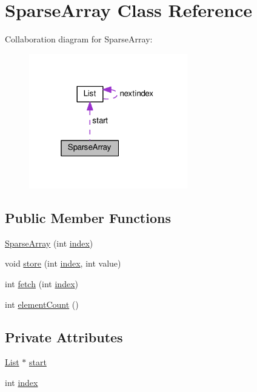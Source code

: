 \hypertarget{classSparseArray}{}\section{Sparse\+Array Class Reference}
\label{classSparseArray}


Collaboration diagram for Sparse\+Array\+:
\nopagebreak
\begin{figure}[H]
\begin{center}
\leavevmode
\includegraphics[width=196pt]{classSparseArray__coll__graph}
\end{center}
\end{figure}
\subsection*{Public Member Functions}
\begin{DoxyCompactItemize}
\item 
\hyperlink{classSparseArray_a5c8fafe693c3954efcd607026fa97beb}{Sparse\+Array} (int \hyperlink{classSparseArray_af5a1db82e35f728926e98d3301a29130}{index})
\item 
void \hyperlink{classSparseArray_a9950c0e59ecf391266e1031863b18984}{store} (int \hyperlink{classSparseArray_af5a1db82e35f728926e98d3301a29130}{index}, int value)
\item 
int \hyperlink{classSparseArray_a818714dcef93b33775bdca60b99e97d7}{fetch} (int \hyperlink{classSparseArray_af5a1db82e35f728926e98d3301a29130}{index})
\item 
int \hyperlink{classSparseArray_a73aa431df6e8d5dfeea682d9e2016acd}{element\+Count} ()
\end{DoxyCompactItemize}
\subsection*{Private Attributes}
\begin{DoxyCompactItemize}
\item 
\hyperlink{classList}{List} $\ast$ \hyperlink{classSparseArray_a57186d34f863d9aeb8fb8b9979db63c5}{start}
\item 
int \hyperlink{classSparseArray_af5a1db82e35f728926e98d3301a29130}{index}
\end{DoxyCompactItemize}


